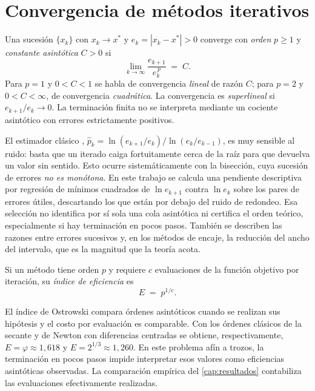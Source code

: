 \section{Convergencia de métodos iterativos}
\label{sec:convergencia}

\begin{definition}
Una sucesión $\{x_k\}$ con $x_k\to x^*$ y $e_k=|x_k-x^*|>0$ converge con
\emph{orden} $p\ge1$ y \emph{constante asintótica} $C>0$ si
\[
  \lim_{k\to\infty}\frac{e_{k+1}}{e_k^{\,p}}\;=\;C.
\]
Para $p=1$ y $0<C<1$ se habla de convergencia \emph{lineal} de
razón $C$; para $p=2$ y $0<C<\infty$, de convergencia \emph{cuadrática}.
La convergencia es \emph{superlineal} si $e_{k+1}/e_k\to0$.
La terminación finita no se interpreta mediante un cociente asintótico con
errores estrictamente positivos.
\end{definition}

\begin{remark}
\label{rem:estimacion-orden}
El estimador clásico \citep[cap.~2]{burden2016},
$\hat p_k=\ln(e_{k+1}/e_k)\big/\ln(e_k/e_{k-1})$, es muy sensible al ruido: basta
que un iterado caiga fortuitamente cerca de la raíz para que devuelva un valor sin
sentido. Esto ocurre sistemáticamente con la bisección, cuya sucesión de errores
\emph{no es monótona}. En este trabajo se calcula una pendiente descriptiva
por regresión de mínimos cuadrados de $\ln e_{k+1}$ contra $\ln e_k$ sobre
los pares de errores útiles, descartando los que están por debajo del ruido
de redondeo. Esa selección no identifica por sí sola una cola asintótica
ni certifica el orden teórico, especialmente si hay terminación en pocos
pasos. También se describen las razones entre errores sucesivos y, en los
métodos de encaje, la reducción del ancho del intervalo, que es la magnitud
que la teoría acota.
\end{remark}

\begin{definition}
\label{def:ostrowski}
Si un método tiene orden $p$ y requiere $c$ evaluaciones de la función objetivo
por iteración, su \emph{índice de eficiencia} es
\[
  E \;=\; p^{1/c}.
\]
\end{definition}

El índice de Ostrowski compara órdenes asintóticos cuando se realizan sus
hipótesis y el costo por evaluación es comparable. Con los órdenes clásicos
de la secante y de Newton con diferencias centradas se obtiene, respectivamente,
$E=\varphi\approx1{,}618$ y $E=2^{1/3}\approx1{,}260$. En este problema afín a
trozos, la terminación en pocos pasos impide interpretar esos valores como
eficiencias asintóticas observadas. La comparación empírica del \cref{cap:resultados} contabiliza las evaluaciones efectivamente realizadas.

